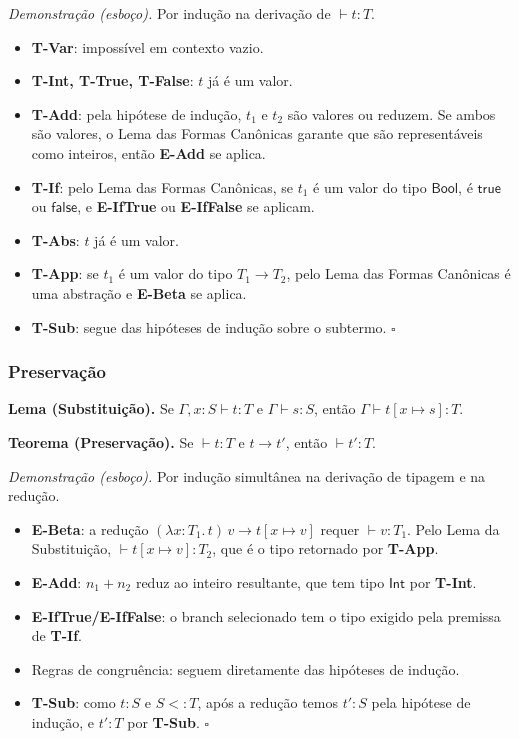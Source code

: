 \emph{Demonstração (esboço).} Por indução na derivação de \(\vdash t : T\).

\begin{itemize}
  \item
    \textbf{T-Var}: impossível em contexto vazio.
  \item
    \textbf{T-Int, T-True, T-False}: \(t\) já é um valor.
  \item
    \textbf{T-Add}: pela hipótese de indução, \(t_1\) e \(t_2\) são
    valores ou reduzem. Se ambos são valores, o Lema das Formas
    Canônicas garante que são representáveis como
    inteiros, então \textbf{E-Add} se aplica.
  \item
    \textbf{T-If}: pelo Lema das Formas Canônicas, se \(t_1\) é um
    valor do tipo \(\mathsf{Bool}\), é \(\mathsf{true}\) ou
    \(\mathsf{false}\), e \textbf{E-IfTrue} ou \textbf{E-IfFalse} se aplicam.
  \item
    \textbf{T-Abs}: \(t\) já é um valor.
  \item
    \textbf{T-App}: se \(t_1\) é um valor do tipo \(T_1 \to T_2\),
    pelo Lema das Formas Canônicas é uma abstração e \textbf{E-Beta} se aplica.
  \item
    \textbf{T-Sub}: segue das hipóteses de indução sobre o subtermo. \(\square\)
\end{itemize}

\subsubsection{Preservação}

\textbf{Lema (Substituição).} Se \(\Gamma, x {:} S \vdash t : T\) e
\(\Gamma \vdash s : S\), então \(\Gamma
\vdash t[x \mapsto s] : T\).

\textbf{Teorema (Preservação).} Se \(\vdash t : T\) e \(t \to t'\),
então \(\vdash t' : T\).

\emph{Demonstração (esboço).} Por indução simultânea na derivação de
tipagem e na redução.

\begin{itemize}
  \item
    \textbf{E-Beta}: a redução \((\lambda x {:} T_1.\, t)\, v \to t[x
    \mapsto v]\) requer \(\vdash v : T_1\). Pelo Lema da
    Substituição, \(\vdash t[x \mapsto v] : T_2\), que é o tipo retornado por \textbf{T-App}.
  \item
    \textbf{E-Add}: \(n_1 + n_2\) reduz ao inteiro resultante, que
    tem tipo \(\mathsf{Int}\) por \textbf{T-Int}.
  \item
    \textbf{E-IfTrue/E-IfFalse}: o branch selecionado tem o tipo
    exigido pela premissa de \textbf{T-If}.
  \item
    Regras de congruência: seguem diretamente das hipóteses de indução.
  \item
    \textbf{T-Sub}: como \(t : S\) e \(S <: T\), após a redução temos
    \(t' : S\) pela hipótese de indução, e \(t' : T\) por
    \textbf{T-Sub}. \(\square\)
\end{itemize}

